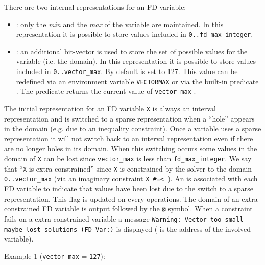 There are two internal representations for an FD variable:

\begin{itemize}

\item {}: only the \emph{min} and the
  \emph{max} of the variable are maintained. In this representation it is
  possible to store values included in \texttt{0..fd\_max\_integer}.

\item {}: an additional bit-vector is used to
  store the set of possible values for the variable (i.e. the domain). In
  this representation it is possible to store values included in
  \texttt{0..vector\_max}. By default  is set to 127.
  This value can be redefined via an environment variable \texttt{VECTORMAX}
  or via the built-in predicate 
  .  The predicate 
  returns the current value of \texttt{vector\_max}
  .

\end{itemize}

The initial representation for an FD variable \texttt{X} is always an
interval representation and is switched to a sparse representation when a
``hole'' appears in the domain (e.g. due to an inequality constraint). Once a
variable uses a sparse representation it will not switch back to an interval
representation even if there are no longer holes in its domain. When this
switching occurs some values in the domain of \texttt{X} can be lost since
\texttt{vector\_max} is less than \texttt{fd\_max\_integer}. We say that
``\texttt{X} is extra-constrained'' since
\texttt{X} is constrained by the solver to the domain
\texttt{0..vector\_max} (via an imaginary constraint
\texttt{X \#=< }). An  is
associated with each FD variable to indicate that values have been lost due to
the switch to a sparse representation. This flag is updated on every
operations. The domain of an extra-constrained FD variable is output followed
by the \texttt{@} symbol. When a constraint fails on a extra-constrained
variable a message \texttt{Warning: Vector too small - maybe lost solutions
  (FD Var:)} is displayed ( is the address of the involved
variable).

Example 1 (\texttt{vector\_max} = \texttt{127}):

